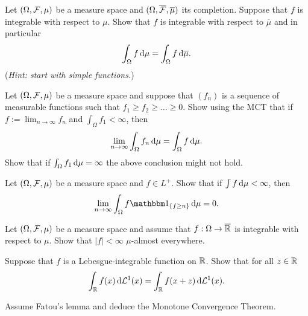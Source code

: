 \begin{problem}
    Let $(\Omega,\mathcal F,\mu)$ be a measure space and  $(\Omega,\overline{\mathcal F},\overline{\mu})$ its completion. Suppose that $f$ is integrable with respect to $\mu$. Show that $f$ is integrable with respect to $\overline{\mu}$ and in particular 
    \begin{equation*}
        \int_{\Omega} f\,\mathrm{d} \mu =  \int_{\Omega} f\,\mathrm{d} \overline{\mu}.
    \end{equation*}
    (\emph{Hint: start with simple functions.})
\end{problem}

\begin{problem} Let $(\Omega,\mathcal F,\mu)$ be a measure space and suppose that $(f_{n})$ is a sequence of measurable functions such that $f_1\geq f_2\geq\ldots \geq 0$. Show using the MCT that if $f :=\lim_{n\to\infty} f_n$ and $\int_{\Omega} f_1<\infty$, then
\begin{equation*}
    \lim_{n\to\infty} \int_\Omega f_n\,\mathrm{d} \mu =  \int_\Omega f\,\mathrm{d} \mu.
\end{equation*}
Show that if $\int_{\Omega} f_1\,\mathrm{d} \mu = \infty$ the above conclusion might not hold.    
\end{problem}

\begin{problem}
    Let $(\Omega,\mathcal F,\mu)$ be a measure space and $f\in L^+$. Show that if $\int f\,\mathrm{d} \mu <\infty$, then
    \begin{equation*}
        \lim_{n\to\infty} \int_\Omega f \ind{f\geq n} \,\De \mu = 0. 
    \end{equation*}
\end{problem}

\begin{problem} Let $(\Omega,\mathcal F,\mu)$ be a measure space and assume that $f:\Omega\to \overline{\mathbb R}$ is integrable with respect to $\mu$. Show that $|f|<\infty$ $\mu$-almost everywhere.
    
\end{problem}

\begin{problem} Suppose that $f$ is a Lebesgue-integrable function on $\mathbb R$. Show that for all $z\in \mathbb R$
    \begin{equation*}
        \int_{\mathbb R} f(x)\,\mathrm{d} \mathcal L^1(x) = \int_{\mathbb R} f(x+z)\,\mathrm{d} \mathcal L^1(x).
    \end{equation*}
\end{problem}

\begin{problem}
    Assume Fatou's lemma and deduce the Monotone Convergence Theorem.
\end{problem}

